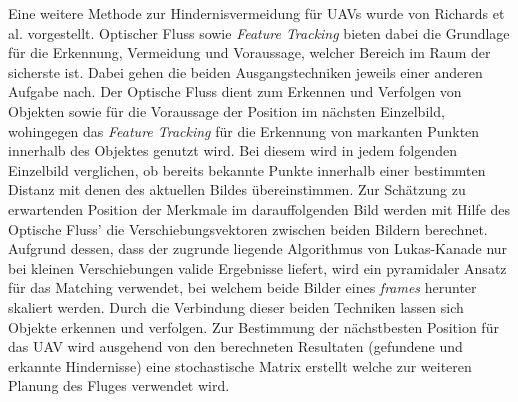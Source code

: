 \noindent
Eine weitere Methode zur Hindernisvermeidung für UAVs wurde von Richards et al. \cite{richards2014obstacle} vorgestellt. Optischer Fluss sowie \emph{Feature Tracking} bieten dabei die Grundlage für die Erkennung, Vermeidung und Voraussage, welcher Bereich im Raum der sicherste ist. Dabei gehen die beiden Ausgangstechniken jeweils einer anderen Aufgabe nach. 
Der Optische Fluss dient zum Erkennen und Verfolgen von Objekten sowie für die Voraussage der Position im nächsten Einzelbild, wohingegen das \emph{Feature Tracking} \cite{shi1994good} für die Erkennung von markanten Punkten innerhalb des Objektes genutzt wird. Bei diesem wird in jedem folgenden Einzelbild verglichen, ob bereits bekannte Punkte innerhalb einer bestimmten Distanz mit denen des aktuellen Bildes übereinstimmen. Zur Schätzung zu erwartenden Position der Merkmale im darauffolgenden Bild werden mit Hilfe des Optische Fluss’ die Verschiebungsvektoren zwischen beiden Bildern berechnet. Aufgrund dessen, dass der zugrunde liegende Algorithmus von Lukas-Kanade \cite{lucas1981iterative} nur bei kleinen Verschiebungen valide Ergebnisse liefert, wird ein pyramidaler Ansatz \cite{bouguet2001pyramidal} für das Matching verwendet, bei welchem beide Bilder eines \emph{frames} herunter skaliert werden. Durch die Verbindung dieser beiden Techniken lassen sich Objekte erkennen und verfolgen. Zur Bestimmung der nächstbesten Position für das UAV wird ausgehend von den berechneten Resultaten (gefundene und erkannte Hindernisse) eine stochastische Matrix erstellt welche zur weiteren Planung des Fluges verwendet wird.\\

